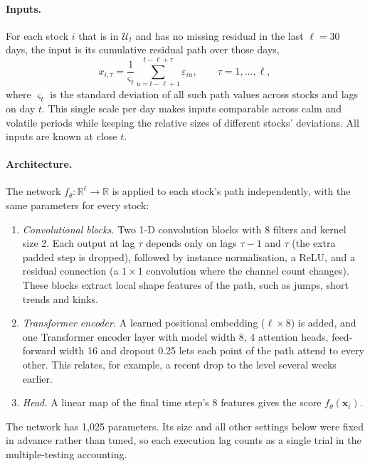\paragraph{Inputs.}
For each stock $i$ that is in $\mathcal U_t$ and has no missing residual in the last
$\ell = 30$ days, the input is its cumulative residual path over those days,
\begin{equation}
  x_{i,\tau} = \frac{1}{\varsigma_t} \sum_{u=t-\ell+1}^{t-\ell+\tau} \varepsilon_{iu},
  \qquad \tau = 1,\dots,\ell,
  \label{eq:deep-input}
\end{equation}
where $\varsigma_t$ is the standard deviation of all such path values across stocks and lags on day
$t$. This single scale per day makes inputs comparable across calm and volatile periods while
keeping the relative sizes of different stocks' deviations. All inputs are known at close $t$.

\paragraph{Architecture.}
The network $f_\theta : \mathbb R^{\ell} \to \mathbb R$ is applied to each stock's path
independently, with the same parameters for every stock:
\begin{enumerate}
  \item \emph{Convolutional blocks.} Two 1-D convolution blocks with 8 filters and kernel size 2.
        Each output at lag $\tau$ depends only on lags $\tau-1$ and $\tau$ (the extra padded step is
        dropped), followed by instance normalisation, a ReLU, and a residual connection (a $1\times1$
        convolution where the channel count changes). These blocks extract local shape features of
        the path, such as jumps, short trends and kinks.
  \item \emph{Transformer encoder.} A learned positional embedding
        ($\ell \times 8$) is added, and one Transformer encoder layer with model width 8, 4
        attention heads, feed-forward width 16 and dropout 0.25 lets each point of the path attend to
        every other. This relates, for example, a recent drop to the level several weeks earlier.
  \item \emph{Head.} A linear map of the final time step's 8 features gives the score
        $f_\theta(\bm x_i)$.
\end{enumerate}
The network has 1{,}025 parameters. Its size and all other settings below were fixed in advance
rather than tuned, so each execution lag counts as a single trial in the multiple-testing
accounting.

